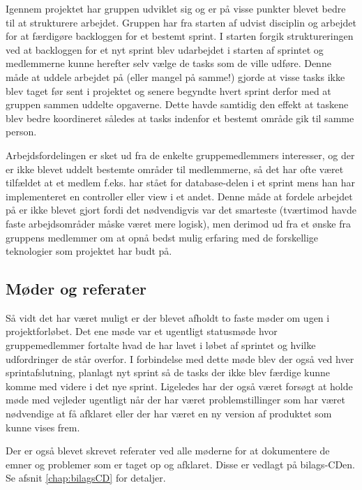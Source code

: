 Igennem projektet har gruppen udviklet sig og er på visse punkter blevet bedre til at strukturere arbejdet. Gruppen har fra starten af udvist disciplin og arbejdet for at færdigøre backloggen for et bestemt sprint. I starten forgik struktureringen ved at backloggen for et nyt sprint blev udarbejdet i starten af sprintet og medlemmerne kunne herefter selv vælge de tasks som de ville udføre. Denne måde at uddele arbejdet på (eller mangel på samme!) gjorde at visse tasks ikke blev taget før sent i projektet og senere begyndte hvert sprint derfor med at gruppen sammen uddelte opgaverne. Dette havde samtidig den effekt at taskene blev bedre koordineret således at tasks indenfor et bestemt område gik til samme person. 

Arbejdsfordelingen er sket ud fra de enkelte gruppemedlemmers interesser, og der er ikke blevet uddelt bestemte områder til medlemmerne, så det har ofte været tilfældet at et medlem f.eks. har stået for database-delen i et sprint mens han har implementeret en controller eller view i et andet. Denne måde at fordele arbejdet på er ikke blevet gjort fordi det nødvendigvis var det smarteste (tværtimod havde faste arbejdsområder måske været mere logisk), men derimod ud fra et ønske fra gruppens medlemmer om at opnå bedst mulig erfaring med de forskellige teknologier som projektet har budt på.

\subsection{Møder og referater}
Så vidt det har været muligt er der blevet afholdt to faste møder om ugen i projektforløbet. Det ene møde var et ugentligt statusmøde hvor gruppemedlemmer fortalte hvad de har lavet i løbet af sprintet og hvilke udfordringer de står overfor. I forbindelse med dette møde blev der også ved hver sprintafslutning, planlagt nyt sprint så de tasks der ikke blev færdige kunne komme med videre i det nye sprint. Ligeledes har der også været forsøgt at holde møde med vejleder ugentligt når der har været problemstillinger som har været nødvendige at få afklaret eller der har været en ny version af produktet som kunne vises frem.

Der er også blevet skrevet referater ved alle møderne for at dokumentere de emner og problemer som er taget op og afklaret. Disse er vedlagt på bilags-CDen. Se afsnit \ref{chap:bilagsCD} for detaljer.


